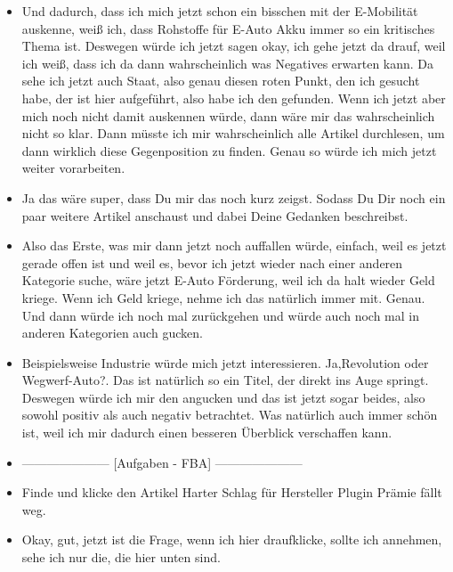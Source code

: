 {\begin{itemize}[]
    Das fehlt mir eigentlich ein bisschen, weil dann muss ich mir wirklich die Artikel Bezeichnungen durchlesen, bevor ich überhaupt weiß, wie dieser Artikel bewertet ist.
    Und da hätte ich halt, würde ich mir jetzt, wenn ich als Nutzer auf diese Seite gehe, wünschen, dass ich da sofort sehe, ist jetzt der positive und welches der negative Artikel ist.
    \item {} Und dadurch, dass ich mich jetzt schon ein bisschen mit der E-Mobilität auskenne, weiß ich, dass Rohstoffe für E-Auto Akku immer so ein kritisches Thema ist.
    Deswegen würde ich jetzt sagen okay, ich gehe jetzt da drauf, weil ich weiß, dass ich da dann wahrscheinlich was Negatives erwarten kann.
    Da sehe ich jetzt auch Staat, also genau diesen roten Punkt, den ich gesucht habe, der ist hier aufgeführt, also habe ich den gefunden.
    Wenn ich jetzt aber mich noch nicht damit auskennen würde, dann wäre mir das wahrscheinlich nicht so klar.
    Dann müsste ich mir wahrscheinlich alle Artikel durchlesen, um dann wirklich diese Gegenposition zu finden.
    Genau so würde ich mich jetzt weiter vorarbeiten.
    \item {} Ja das wäre super, dass Du mir das noch kurz zeigst. 
    Sodass Du Dir noch ein paar weitere Artikel anschaust und dabei Deine Gedanken beschreibst.
    \item {} Also das Erste, was mir dann jetzt noch auffallen würde, einfach, weil es jetzt gerade offen ist und weil es, bevor ich jetzt wieder nach einer anderen Kategorie suche, wäre jetzt \flqq E-Auto Förderung\frqq{}, weil ich da halt wieder Geld kriege.
    Wenn ich Geld kriege, nehme ich das natürlich immer mit.
    Genau.
    Und dann würde ich noch mal zurückgehen und würde auch noch mal in anderen Kategorien auch gucken.
    \item {} Beispielsweise Industrie würde mich jetzt interessieren.
    Ja,\flqq Revolution oder Wegwerf-Auto?\frqq{}.
    Das ist natürlich so ein Titel, der direkt ins Auge springt.
    Deswegen würde ich mir den angucken und das ist jetzt sogar beides, also sowohl positiv als auch negativ betrachtet.
    Was natürlich auch immer schön ist, weil ich mir dadurch einen besseren Überblick verschaffen kann.
    \item {---------------------} [Aufgaben - FBA] {---------------------}
    \item {} Finde und klicke den Artikel \flqq Harter Schlag für Hersteller Plugin Prämie fällt weg\frqq{}.
    \item {} Okay, gut, jetzt ist die Frage, wenn ich hier draufklicke, sollte ich annehmen, sehe ich nur die, die hier unten sind.

\end{itemize}}
